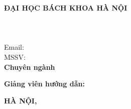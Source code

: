\begin{titlepage}
\thispagestyle{empty}

\begin{center}

{\textbf{\large{ĐẠI HỌC BÁCH KHOA HÀ NỘI}}}\\[4cm]

{\textbf{\huge{\LoaiBaoCao}}}\\[1cm]
{\textbf{\Large{\TieuDeBia}}}\\[1cm]

{\textbf{\large{\Trong{\HoTenSinhVien}}}}\\
{\large{Email: \Trong{\EmailSinhVien}}}\\
{\large{MSSV: \Trong[35mm]{\MaSoSinhVien}}}\\[0.5cm]
{\textbf{\large{Chuyên ngành \Trong[40mm]{\NganhDaoTao}}}}\\

\vspace{\dimexpr 3cm-36.66pt\relax}

{\large \textbf{Giảng viên hướng dẫn:} \Trong[45mm]{\GiangVienHuongDan}}

\vspace{7cm}

\textbf{HÀ NỘI, \ThoiGianBaoCao}

\end{center}

\end{titlepage}
